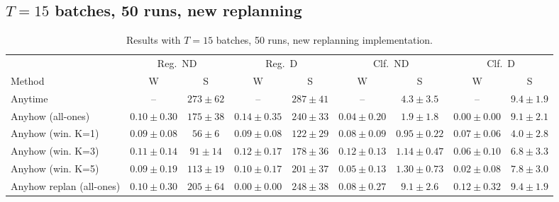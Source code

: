 \documentclass{uai2026} %
\newcommand{\1}{\mathbf{1}}
\begin{document}
\subsection{$T = 15$ batches, 50 runs, new replanning}
\label{app:results-15-50-new}

\begin{table}[ht]
  \centering
  \caption{Results with $T = 15$ batches, 50 runs, new replanning implementation.}
  \label{tab:results-15-50-new}
  \small
  \begin{tabular}{@{}l|cc|cc|cc|cc@{}}
    \toprule
                             & \multicolumn{2}{c|}{Reg.\ ND}
                             & \multicolumn{2}{c|}{Reg.\ D}
                             & \multicolumn{2}{c|}{Clf.\ ND}
                             & \multicolumn{2}{c}{Clf.\ D}                                                                                                                         \\
    \cmidrule(lr){2-3}\cmidrule(lr){4-5}\cmidrule(lr){6-7}\cmidrule(lr){8-9}
    Method                   & W                             & S            & W               & S            & W               & S               & W               & S             \\
    \midrule
    Anytime                  & --                            & $273{\pm}62$ & --              & $287{\pm}41$ & --              & $4.3{\pm}3.5$   & --              & $9.4{\pm}1.9$ \\
    Anyhow (all-ones)        & $0.10{\pm}0.30$               & $175{\pm}38$ & $0.14{\pm}0.35$ & $240{\pm}33$ & $0.04{\pm}0.20$ & $1.9{\pm}1.8$   & $0.00{\pm}0.00$ & $9.1{\pm}2.1$ \\
    Anyhow (win. K=1)        & $0.09{\pm}0.08$               & $56{\pm}6$   & $0.09{\pm}0.08$ & $122{\pm}29$ & $0.08{\pm}0.09$ & $0.95{\pm}0.22$ & $0.07{\pm}0.06$ & $4.0{\pm}2.8$ \\
    Anyhow (win. K=3)        & $0.11{\pm}0.14$               & $91{\pm}14$  & $0.12{\pm}0.17$ & $178{\pm}36$ & $0.12{\pm}0.13$ & $1.14{\pm}0.47$ & $0.06{\pm}0.10$ & $6.8{\pm}3.3$ \\
    Anyhow (win. K=5)        & $0.09{\pm}0.19$               & $113{\pm}19$ & $0.10{\pm}0.17$ & $201{\pm}37$ & $0.05{\pm}0.13$ & $1.30{\pm}0.73$ & $0.02{\pm}0.08$ & $7.8{\pm}3.0$ \\
    Anyhow replan (all-ones) & $0.10{\pm}0.30$               & $205{\pm}64$ & $0.00{\pm}0.00$ & $248{\pm}38$ & $0.08{\pm}0.27$ & $9.1{\pm}2.6$   & $0.12{\pm}0.32$ & $9.4{\pm}1.9$ \\

\end{tabular}
\end{table}
\end{document}
